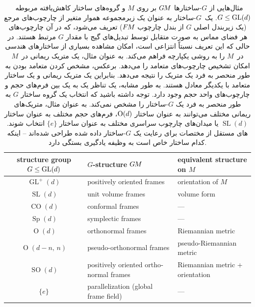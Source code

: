 \begin{table}
	\centering
	\renewcommand\arraystretch{1.1}
	\small
	\begin{latin}
		\begin{tabular}{cll}
			\toprule
			structure group $G\leq\operatorname{GL}(d)$ & $G$-structure $G\mkern-1.4muM$			& equivalent structure on $M$		\\[.25ex]
			\midrule
			$\operatorname{GL}^+(d)$	& positively oriented frames			& orientation of $M$			\\
			$\operatorname{SL}(d)$		& unit volume frames				& volume form				\\
			$\operatorname{CO}(d)$		& conformal frames				& ---					\\
			$\operatorname{Sp}(d)$		& symplectic frames				& ---					\\
			$\operatorname{O}(d)$		& orthonormal frames				& Riemannian metric			\\
			$\operatorname{O}(d-n,\,n)$	& pseudo-orthonormal frames			& pseudo-Riemannian metric		\\
			$\operatorname{SO}(d)$		& positively oriented orthonormal frames	& Riemannian metric + orientation	\\
			$\{e\}$				& parallelization (global frame field)	& ---					\\[.25ex]
			\bottomrule
		\end{tabular}
	\end{latin}
	\vspace*{2ex}
	\caption{
		مثال‌هایی از $G$-ساختارها $G\mkern-1.4muM$ بر روی $M$ و گروه‌های ساختار کاهش‌یافته مربوطه~$G\leq\operatorname{GL}(d)$.
		یک~$G$-ساختار به عنوان یک زیرمجموعه هموار متغیر از چارچوب‌های مرجع (یک زیربندل اصلی $G$ از بندل چارچوب $F\mkern-1.5muM$) تعریف می‌شود، که در آن چارچوب‌های هر فضای مماس به صورت متقابل توسط تبدیل‌های گیج با مقدار $G$ مرتبط هستند.
		در حالی که این تعریف نسبتاً انتزاعی است، امکان مشاهده بسیاری از ساختارهای هندسی در~$M$ را به روشی یکپارچه فراهم می‌کند.
		به عنوان مثال، یک متریک ریمانی در~$M$ امکان تشخیص چارچوب‌های متعامد را می‌دهد.
		برعکس، مشخص کردن متعامد بودن به طور منحصر به فرد یک متریک را نتیجه می‌دهد.
		بنابراین یک متریک ریمانی و یک ساختار متعامد با یکدیگر معادل هستند.
		به طور مشابه، یک تناظر یک به یک بین فرم‌های حجم و چارچوب‌های واحد حجم وجود دارد.
		توجه داشته باشید که انتخاب یک گروه ساختار $G$ به طور منحصر به فرد یک $G$-ساختار را مشخص نمی‌کند.
		به عنوان مثال، متریک‌های ریمانی مختلف می‌توانند به عنوان ساختار $\operatorname{O}(d)$، فرم‌های حجم مختلف به عنوان ساختار $\operatorname{SL}(d)$ یا میدان‌های چارچوب سراسری مختلف به عنوان ساختار $\{e\}$ انتخاب شوند.
		\CNN{}های مستقل از مختصات برای رعایت یک $G$-ساختار داده شده طراحی شده‌اند -- اینکه کدام ساختار خاص است به وظیفه یادگیری بستگی دارد.
	}
	\label{tab:G_structures}
\end{table}



